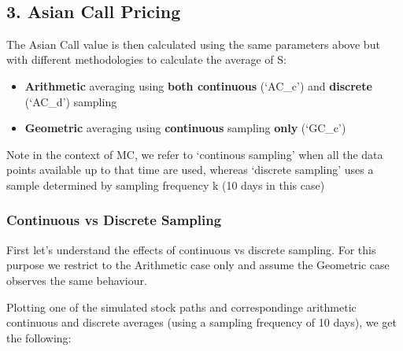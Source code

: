 \documentclass{article}
\providecommand{\tightlist}{%
      \setlength{\itemsep}{0pt}\setlength{\parskip}{0pt}}
\begin{document}
    \begin{center}
    \end{center}
    { \hspace*{\fill} \\}
    
    \subsection{3. Asian Call Pricing}\label{asian-call-pricing}

The Asian Call value is then calculated using the same parameters above
but with different methodologies to calculate the average of S:

\begin{itemize}
\tightlist
\item
  \textbf{Arithmetic} averaging using \textbf{both continuous} (`AC\_c')
  and \textbf{discrete} (`AC\_d') sampling
\item
  \textbf{Geometric} averaging using \textbf{continuous} sampling
  \textbf{only} (`GC\_c')
\end{itemize}

Note in the context of MC, we refer to `continous sampling' when all the
data points available up to that time are used, whereas `discrete
sampling' uses a sample determined by sampling frequency k (10 days in
this case)

    \subsubsection{Continuous vs Discrete
Sampling}\label{continuous-vs-discrete-sampling}

First let's understand the effects of continuous vs discrete sampling.
For this purpose we restrict to the Arithmetic case only and assume the
Geometric case observes the same behaviour.

Plotting one of the simulated stock paths and correspondinge arithmetic
continuous and discrete averages (using a sampling frequency of 10
days), we get the following:
\end{document}
